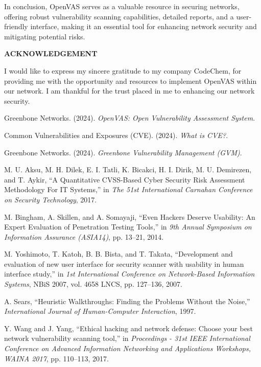 \documentclass[twocolumn]{article}
\begin{document}
In conclusion, OpenVAS serves as a valuable resource in securing networks, offering robust vulnerability scanning capabilities, detailed reports, and a user-friendly interface, making it an essential tool for enhancing network security and mitigating potential risks.

\begin{center} \textbf{ACKNOWLEDGEMENT} \end{center}
I would like to express my sincere gratitude to my company CodeChem, for providing me with the opportunity and resources to implement OpenVAS within our network. I am thankful for the trust placed in me to enhancing our network security.

\begin{thebibliography}{99}

Greenbone Networks. (2024). \textit{OpenVAS: Open Vulnerability Assessment System}.

Common Vulnerabilities and Exposures (CVE). (2024). \textit{What is CVE?}.

Greenbone Networks. (2024). \textit{Greenbone Vulnerability Management (GVM)}.

M. U. Aksu, M. H. Dilek, E. I. Tatli, K. Bicakci, H. I. Dirik, M. U. Demirezen, and T. Aykir, “A Quantitative CVSS-Based Cyber Security Risk Assessment Methodology For IT Systems,” in \textit{The 51st International Carnahan Conference on Security Technology}, 2017.

M. Bingham, A. Skillen, and A. Somayaji, “Even Hackers Deserve Usability: An Expert Evaluation of Penetration Testing Tools,” in \textit{9th Annual Symposium on Information Assurance (ASIA14)}, pp. 13–21, 2014.

M. Yoshimoto, T. Katoh, B. B. Bista, and T. Takata, “Development and evaluation of new user interface for security scanner with usability in human interface study,” in \textit{1st International Conference on Network-Based Information Systems}, NBiS 2007, vol. 4658 LNCS, pp. 127–136, 2007.

A. Sears, “Heuristic Walkthroughs: Finding the Problems Without the Noise,” \textit{International Journal of Human-Computer Interaction}, 1997.

Y. Wang and J. Yang, “Ethical hacking and network defense: Choose your best network vulnerability scanning tool,” in \textit{Proceedings - 31st IEEE International Conference on Advanced Information Networking and Applications Workshops, WAINA 2017}, pp. 110–113, 2017.


\end{thebibliography}
\end{document}
